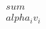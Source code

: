 \documentclass[preview]{standalone}
\begin{document}
\begin{align*}
\quad\\sum \quad\\alpha_i v_i
\end{align*}
\end{document}
